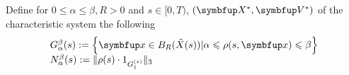 

\begin{definition}
  Define for $0 \leqslant \alpha \leqslant \beta, R>0$ and $s \in[0, T)$, $(\vect{X}^*, \vect{V}^*)$ of the characteristic system the following 
\[
\begin{array}{l}
G_{\alpha}^{\beta}(s):=\left\{\vx \in B_{R}(\hat{X}(s)) | \alpha \leqslant \rho(s, \vx) \leqslant \beta\right\} \\
N_{\alpha}^{\beta}(s):=\|\rho(s) \cdot 1_{G_{1}^{(s)}}\|_{3}
\end{array}
\]
\end{definition}




